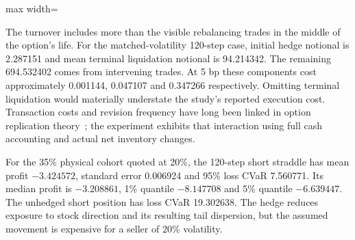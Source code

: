 \documentclass[8pt]{strategynet-journal}
\begin{document}
\begin{SNcolumns}
\begin{center}
\begin{adjustbox}{max width=\linewidth}
\end{adjustbox}
\end{center}

The turnover includes more than the visible rebalancing trades in the middle
of the option's life. For the matched-volatility 120-step case, initial hedge
notional is 2.287151 and mean terminal liquidation notional is 94.214342. The
remaining 694.532402 comes from intervening trades. At 5 bp these components cost
approximately 0.001144, 0.047107 and 0.347266 respectively. Omitting terminal
liquidation would materially understate the study's reported execution cost.
Transaction costs and revision frequency have long been linked in option
replication theory~\cite{leland}; the experiment exhibits that interaction using
full cash accounting and actual net inventory changes.

For the 35\% physical cohort quoted at 20\%, the 120-step short straddle has mean
profit $-3.424572$, standard error 0.006924 and 95\% loss CVaR 7.560771. Its median
profit is $-3.208861$, 1\% quantile $-8.147708$ and 5\% quantile $-6.639447$.
The unhedged short position has loss CVaR 19.302638. The hedge reduces exposure
to stock direction and its resulting tail dispersion, but the assumed movement
is expensive for a seller of 20\% volatility.


\end{SNcolumns}
\end{document}
